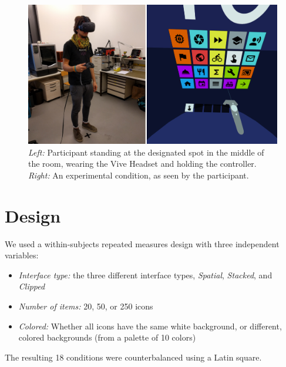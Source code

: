 \documentclass{tufte-book} %
\begin{document}
\begin{figure}
  \includegraphics{participant+view.png}
  \caption{\emph{Left:} Participant standing at the designated spot in the middle of the room, wearing the Vive Headset and holding the controller. \emph{Right:} An experimental condition, as seen by the participant.}
  \label{fig:participant-view}
\end{figure}

\section{Design}
We used a within-subjects repeated measures design with three independent variables:

\begin{itemize}
  \item \emph{Interface type:} the three different interface types, \emph{Spatial}, \emph{Stacked}, and \emph{Clipped}
  \item \emph{Number of items:} 20, 50, or 250 icons
  \item \emph{Colored:} Whether all icons have the same white background, or different, colored backgrounds (from a palette of 10 colors)
\end{itemize}

The resulting 18 conditions were counterbalanced using a Latin square.
\end{document}
